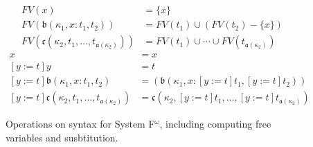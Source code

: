 
\begin{figure}
    \centering
    \begin{align*}
        FV(x) &= \{x\} \\
        FV(\mathfrak{b}(\kappa_1, x : t_1, t_2)) &= FV(t_1) \cup (FV(t_2) - \{x\}) \\
        FV(\mathfrak{c}(\kappa_2, t_1, \ldots, t_{\mathfrak{a}(\kappa_2)})) &= FV(t_1) \cup \cdots \cup FV(t_{\mathfrak{a}(\kappa_2)})
    \end{align*}
    \begin{align*}
        [y := t]x &= x \\
        [y := t]y &= t \\
        [y := t]\mathfrak{b}(\kappa_1, x : t_1, t_2) &= (\mathfrak{b}(\kappa_1, x : [y := t]t_1, [y := t]t_2))  \\
        [y := t]\mathfrak{c}(\kappa_2, t_1, \ldots, t_{\mathfrak{a}(\kappa_2)}) &= \mathfrak{c}(\kappa_2, [y := t]t_1, \ldots, [y := t]t_{\mathfrak{a}(\kappa_2)})
    \end{align*}
    \caption{Operations on syntax for System F$^\omega$, including computing free variables and susbtitution.}
    \label{fig:ops_f}
\end{figure}
